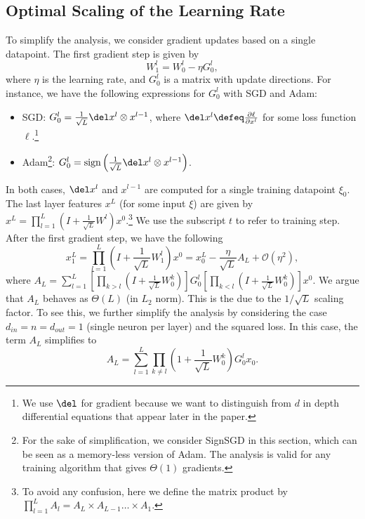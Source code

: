\subsection{Optimal Scaling of the Learning Rate}
To simplify the analysis, we consider gradient updates based on a single datapoint. The first gradient step is given by 
$$
W^l_1 = W^l_0 - \eta G^l_0, 
$$
where $\eta$ is the learning rate, and $G^l_0$ is a matrix with update directions. For instance, we have the following expressions for $G^l_0$ with SGD and Adam:
\begin{itemize}
    \item SGD: $G^l_0 = \frac{1}{\sqrt{L}} \del x^{l} \otimes x^{l-1}$, where $\del x^l \defeq \frac{\partial \ell}{\partial x^l}$ for some loss function $\ell$.\footnote{We use $\del$ for gradient because we want to distinguish from $d$ in depth differential equations that appear later in the paper. }
    \item Adam\footnote{For the sake of simplification, we consider SignSGD in this section, which can be seen as a memory-less version of Adam. The analysis is valid for any training algorithm that gives $\Theta(1)$ gradients.}:  $G^l_0 = \textrm{sign}\left(\frac{1}{\sqrt{L}} \del x^{l} \otimes x^{l-1}\right)$.
\end{itemize}
In both cases, $\del x^{l}$ and $x^{l-1}$ are computed for a single training datapoint $\xi_0$.
The last layer features $x^L$ (for some input $\xi$) are given by $x^L = \prod_{l=1}^L \left( I + \frac{1}{\sqrt{L}} W^l\right) x^0$.\footnote{ To avoid any confusion, here we define the matrix product by $\prod_{l=1}^L A_l = A_L \times A_{L-1} \dots \times A_1$.} We use the subscript $t$ to refer to training step. After the first gradient step, we have the following 
\begin{equation}\label{eq:first_order_linear}
x^L_1 = \prod_{l=1}^L \left( I + \frac{1}{\sqrt{L}} W^l_1\right) x^0 = x^L_0 - \frac{\eta}{\sqrt{L}} A_L + \mathcal{O}(\eta^2),
\end{equation}
where $A_L = \sum_{l=1}^L \left[\prod_{k>l} \left( I + \frac{1}{\sqrt{L}} W^k_0\right)\right] G^l_0 \left[\prod_{k<l} \left( I + \frac{1}{\sqrt{L}} W^k_0\right)\right] x^0$. 
We argue that $A_L$ behaves as $\Theta(L)$ (in $L_2$ norm). This is the due to the $1/\sqrt{L}$ scaling factor. To see this, we further simplify the analysis by considering the case $d_{in} = n = d_{out} = 1$ (single neuron per layer) and the squared loss. In this case, the term $A_L$ simplifies to 
$$
A_L = \sum_{l=1}^L \prod_{k \neq l}\left(1 + \frac{1}{\sqrt{L}} W^k_0\right) G^l_0 x_0.
$$

